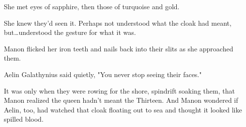 She met eyes of sapphire, then those of turquoise and gold.

She knew they'd seen it.
Perhaps not understood what the cloak had meant, but\ldots understood the gesture for what it was.

Manon flicked her iron teeth and nails back into their slits as she approached them.

Aelin Galathynius said quietly, "You never stop seeing their faces."

It was only when they were rowing for the shore, spindrift soaking them, that Manon realized the queen hadn't meant the Thirteen.
And Manon wondered if Aelin, too, had watched that cloak floating out to sea and thought it looked like spilled blood.
